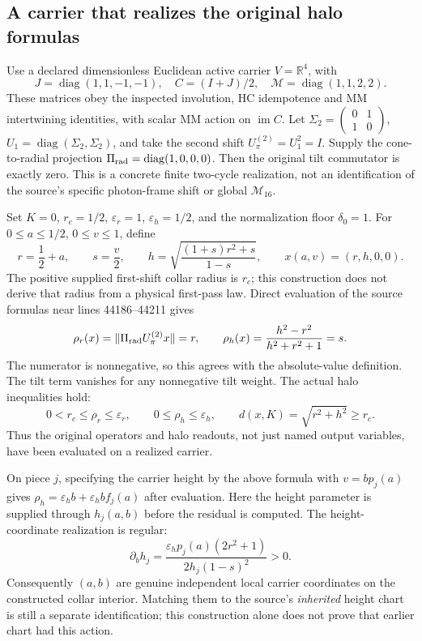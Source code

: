 \documentclass[11pt,a4paper]{article}
\begin{document}
\subsection{A carrier that realizes the original halo formulas}
Use a declared dimensionless Euclidean active carrier $V=\mathbb R^4$,
with
\[
 J=\operatorname{diag}(1,1,-1,-1),\quad
 C=(I+J)/2,\quad\mathcal M=\operatorname{diag}(1,1,2,2).
\]
These matrices obey the inspected involution, HC idempotence and MM
intertwining identities, with scalar MM action on $\operatorname{im}C$.
Let $\Sigma_2=\left(\begin{smallmatrix}0&1\\1&0\end{smallmatrix}\right)$,
$U_1=\operatorname{diag}(\Sigma_2,\Sigma_2)$, and take the second
shift $U_\pi^{(2)}=U_1^2=I$. Supply the cone-to-radial projection
$\Pi_{\rm rad}=\operatorname{diag}(1,0,0,0)$.
Then the original tilt commutator is exactly zero. This is a concrete
finite two-cycle realization, not an identification of the source's
specific photon-frame shift or global $\mathcal M_{16}$.

Set $K=0$, $r_c=1/2$, $\varepsilon_r=1$,
$\varepsilon_h=1/2$, and the normalization floor $\delta_0=1$.
For $0\le a\le1/2$, $0\le v\le1$, define
\[
 r=\frac12+a,\qquad s=\frac v2,\qquad
 h=\sqrt{\frac{(1+s)r^2+s}{1-s}},\qquad
 x(a,v)=(r,h,0,0).
\]
The positive supplied first-shift collar radius is $r_c$; this
construction does not derive that radius from a physical first-pass law.
Direct evaluation of the source formulas near lines 44186--44211 gives
\[
 \rho_r(x)=\|\Pi_{\rm rad}U_\pi^{(2)}x\|=r,
 \qquad
 \rho_h(x)=\frac{h^2-r^2}{h^2+r^2+1}=s.
\]
The numerator is nonnegative, so this agrees with the absolute-value
definition. The tilt term vanishes for any nonnegative tilt weight.
The actual halo inequalities hold:
\[
 0<r_c\le\rho_r\le\varepsilon_r,
 \qquad0\le\rho_h\le\varepsilon_h,
 \qquad d(x,K)=\sqrt{r^2+h^2}\ge r_c.
\]
Thus the original operators and halo readouts, not just named output
variables, have been evaluated on a realized carrier.

On piece $j$, specifying the carrier height by the above formula with
$v=bp_j(a)$ gives
$\rho_h=\varepsilon_h b+\varepsilon_h bf_j(a)$ after evaluation.
Here the height parameter is supplied through $h_j(a,b)$ before the
residual is computed. The height-coordinate realization is regular:
\[
 \partial_b h_j
 =\frac{\varepsilon_h p_j(a)(2r^2+1)}
 {2h_j(1-s)^2}>0.
\]
Consequently $(a,b)$ are genuine independent local carrier coordinates
on the constructed collar interior. Matching them to the source's
\emph{inherited} height chart is still a separate identification; this
construction alone does not prove that earlier chart had this action.
\end{document}
